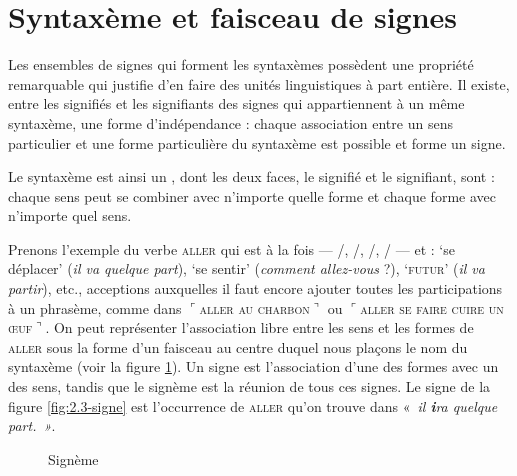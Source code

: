 \section{Syntaxème et faisceau de signes}\label{sec:2.3.17}

Les ensembles de signes qui forment les syntaxèmes possèdent une propriété remarquable qui justifie d’en faire des unités linguistiques à part entière. Il existe, entre les signifiés et les signifiants des signes qui appartiennent à un même syntaxème, une forme d’indépendance : chaque association entre un sens particulier et une forme particulière du syntaxème est possible et forme un signe.

{Le syntaxème est ainsi un , dont les deux faces, le signifié et le signifiant, sont : chaque sens peut se combiner avec n’importe quelle forme et chaque forme avec n’importe quel sens.}

Prenons l’exemple du verbe \textsc{aller} qui est à la fois  — /, /, /, / — et  : ‘se déplacer’ (\textit{il va quelque part}), ‘se sentir’ (\textit{comment allez-vous} ?), ‘\textsc{futur}’ (\textit{il va partir}), etc., acceptions auxquelles il faut encore ajouter toutes les participations à un phrasème, comme dans $⌜$\textsc{aller} \textsc{au} \textsc{charbon}$⌝$ ou $⌜$\textsc{aller} \textsc{se} \textsc{faire} \textsc{cuire} \textsc{un} \textsc{œuf}$⌝$. On peut représenter l’association libre entre les sens et les formes de \textsc{aller} sous la forme d’un faisceau au centre duquel nous plaçons le nom du syntaxème (voir la figure \ref{fig:2.3-signeme}). Un signe est l’association d’une des formes avec un des sens, tandis que le signème est la réunion de tous ces signes. Le signe de la figure \ref{fig:2.3-signe} est l'occurrence de \textsc{aller} qu'on trouve dans «~\textit{il \textbf{i}ra quelque part.~»}.


\begin{figure}
\caption{Signème\label{fig:2.3-signeme}}
\end{figure}

